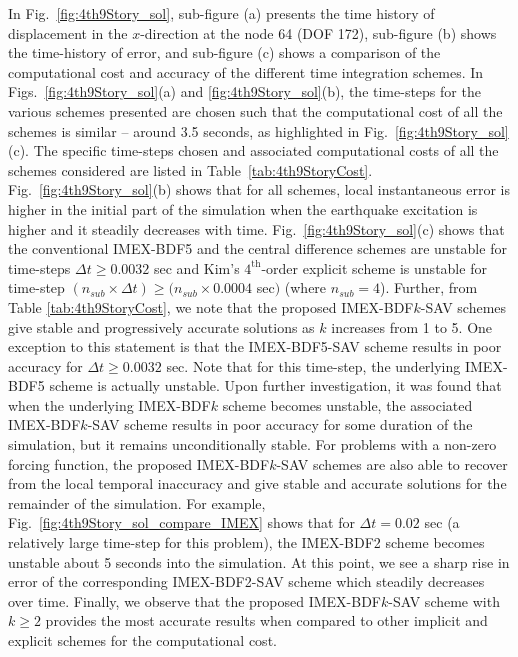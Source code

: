 \documentclass[review]{elsarticle}
\begin{document}
In Fig.~\ref{fig:4th9Story_sol}, sub-figure (a) presents the time history of displacement in the $x$-direction at the node 64 (DOF 172), sub-figure (b) shows the time-history of error, and sub-figure (c) shows a comparison of the computational cost and accuracy of the different time integration schemes.
In Figs.~\ref{fig:4th9Story_sol}(a) and \ref{fig:4th9Story_sol}(b), the time-steps for the various schemes presented are chosen such that the computational cost of all the schemes is similar --
around 3.5 seconds, as highlighted in Fig.~\ref{fig:4th9Story_sol}(c).
The specific time-steps chosen and associated computational costs of all the schemes considered are listed in Table~\ref{tab:4th9StoryCost}.
Fig.~\ref{fig:4th9Story_sol}(b) shows that for all schemes, local instantaneous error is higher in the initial part of the simulation when the earthquake excitation is higher and it steadily decreases with time.
Fig.~\ref{fig:4th9Story_sol}(c) shows that the conventional IMEX-BDF5 and the central difference schemes are unstable for time-steps $\Delta t \ge 0.0032$ sec and Kim's $4^\textrm{th}$-order explicit scheme is unstable for time-step $(n_{sub} \times \Delta t) \ge (n_{sub}\times0.0004$ sec$)$ (where $n_{sub} = 4$).
Further, from Table \ref{tab:4th9StoryCost}, we note that the proposed IMEX-BDF$k$-SAV schemes give stable and progressively accurate solutions as $k$ increases from 1 to 5.
One exception to this statement is that the IMEX-BDF5-SAV scheme results in poor accuracy for $\Delta t \ge 0.0032$ sec.
Note that for this time-step, the underlying IMEX-BDF5 scheme is actually unstable.
Upon further investigation, it was found that when the underlying IMEX-BDF$k$ scheme becomes unstable, the associated IMEX-BDF$k$-SAV scheme results in poor accuracy for some duration of the simulation, but it remains unconditionally stable.
For problems with a non-zero forcing function, the proposed IMEX-BDF$k$-SAV schemes are also able to recover from the local temporal inaccuracy and give stable and accurate solutions for the remainder of the simulation.
For example, Fig.~\ref{fig:4th9Story_sol_compare_IMEX} shows that for $\Delta t = 0.02$ sec (a relatively large time-step for this problem), the IMEX-BDF2 scheme becomes unstable about 5 seconds into the simulation.
At this point, we see a sharp rise in error of the corresponding IMEX-BDF2-SAV scheme which steadily decreases over time.
Finally, we observe that the proposed IMEX-BDF$k$-SAV scheme with $k \ge 2$ provides the most accurate results when compared to other implicit and explicit schemes for the computational cost.
\end{document}
